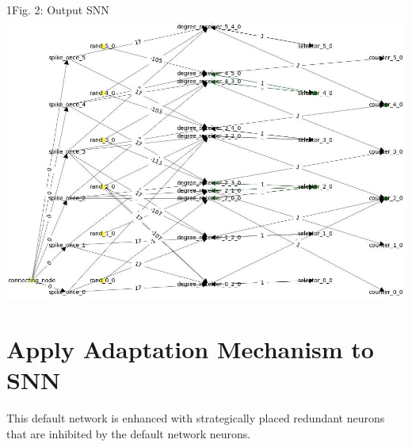 \begin{rudifig}{1\hsize}{Fig. 2: Output SNN}
    \hspace{-1em}
    \includegraphics[width=1.05\linewidth]{latex/Images/cropped.jpeg}
    \label{fig:encoded_snn}
\end{rudifig}



\section{Apply Adaptation Mechanism to SNN}\label{subsec:adaptation}
This default network is enhanced with strategically placed redundant neurons that are inhibited by the default network neurons. 


